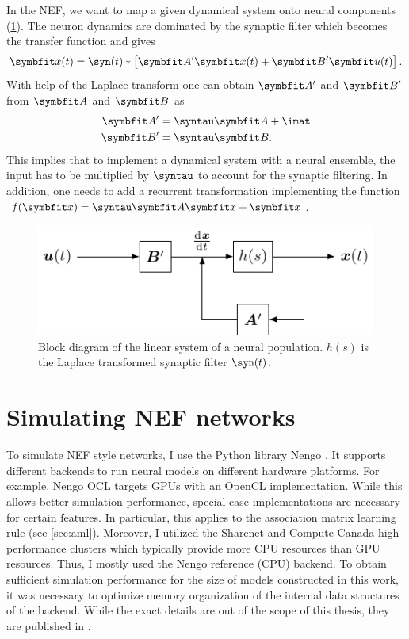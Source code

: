 In the NEF, we want to map a given dynamical system onto neural components (\cref{fig:neural-lti}).
The neuron dynamics are dominated by the synaptic filter \parencite[Appendix~F.1]{eliasmith2003} which becomes the transfer function and gives
\begin{equation}
    \vc x(t) = \syn(t) * \sbr{\mat A' \vc x(t) + \mat B' \vc u(t)} \text{.}
\end{equation}
With help of the Laplace transform one can obtain $\mat A'$ and $\mat B'$ from $\mat A$ and $\mat B$ as
\begin{align}
    \mat A' &= \syntau \mat A + \imat \\
    \mat B' &= \syntau \mat B  \text{.}
\end{align}
This implies that to implement a dynamical system with a neural ensemble, the input has to be multiplied by $\syntau$ to account for the synaptic filtering.
In addition, one needs to add a recurrent transformation implementing the function $f(\vc x) = \syntau \mat A \vc x + \vc x$.
\begin{figure}
    \centering
    \includegraphics{tikz/neural-lti}
    \caption[Block diagram of the linear system of a neural population]{Block diagram of the linear system of a neural population. $h(s)$ is the Laplace transformed synaptic filter $\syn(t)$.}\label{fig:neural-lti}
\end{figure}


\section{Simulating NEF networks}
To simulate NEF style networks, I use the Python library Nengo \parencite{bekolay2014,sharma2016}.
It supports different backends to run neural models on different hardware platforms.
For example, Nengo OCL targets GPUs with an OpenCL implementation.
While this allows better simulation performance, special case implementations are necessary for certain features.
In particular, this applies to the association matrix learning rule (see \cref{sec:aml}).
Moreover, I utilized the Sharcnet and Compute Canada high-performance clusters which typically provide more CPU resources than GPU resources.
Thus, I mostly used the Nengo reference (CPU) backend.
To obtain sufficient simulation performance for the size of models constructed in this work, it was necessary to optimize memory organization of the internal data structures of the backend.
While the exact details are out of the scope of this thesis, they are published in \textcite{gosmann2017}.
